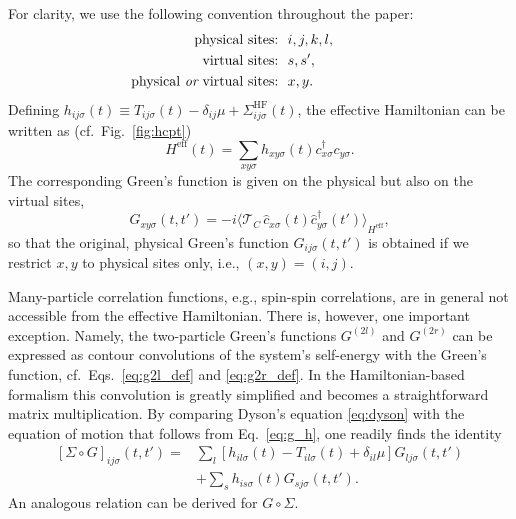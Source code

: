 \documentclass[twocolumn,prb,showpacs,aps,superscriptaddress]{revtex4}
\newcommand{\cds}[1]{\ensuremath{c^\dagger_{#1}}}
\newcommand{\ccs}[1]{\ensuremath{c_{#1}}}
\newcommand{\cd}[1]{\ensuremath{\hat{c}^\dagger_{#1}}}
\newcommand{\cc}[1]{\ensuremath{\hat{c}_{#1}}}
\newcommand{\est}[1]{\ensuremath{\langle {#1} \rangle}}
\newcommand{\tcorder}[0]{\ensuremath{\mathcal{T}_C}}
\begin{document}
For clarity, we use the following convention throughout the paper:
\begin{align} 
  \text{physical sites:}&~~i,j,k,l,\qquad\qquad\\
  \text{virtual sites:}&~~s,s',\nonumber\\ 
  \text{physical {\em or} virtual sites:}&~~x,y.\nonumber
\end{align} 
Defining $h_{ij\sigma}(t) \equiv T_{ij\sigma}(t) - \delta_{ij}\mu +
\Sigma^\mathrm{HF}_{ij\sigma}(t)$, the effective Hamiltonian can be written as
(cf.\ Fig.\ \ref{fig:hcpt})
\begin{equation}
  \label{eq:h_TU}
  H^\mathrm{eff}(t) 
  = 
  \sum_{xy\sigma} h_{xy\sigma}(t) \cds{x\sigma}\ccs{y\sigma}.
\end{equation}
The corresponding Green's function is given on the physical but also on the
virtual sites, 
\begin{equation}
  \label{eq:g_h}
  G_{xy\sigma}(t,t')
  =
  -i
  \est
  {
    \tcorder\,\cc{x\sigma}(t)\cd{y\sigma}(t')
  }_{ H^\mathrm{eff} },
\end{equation}
so that the original, physical Green's function $G_{ij\sigma}(t,t')$ is
obtained if we restrict $x,y$ to physical sites only, i.e., $(x,y) = (i,j)$.

Many-particle correlation functions, e.g., spin-spin correlations, are in
general not accessible from the effective Hamiltonian.  There is, however, one
important exception. Namely, the two-particle Green's functions $G^{(2l)}$ and
$G^{(2r)}$ can be expressed as contour convolutions of the system's self-energy
with the Green's function, cf.\ Eqs.\ \eqref{eq:g2l_def} and
\eqref{eq:g2r_def}. In the Hamiltonian-based formalism this convolution is
greatly simplified and becomes a straightforward matrix multiplication. By
comparing Dyson's equation \eqref{eq:dyson} with the equation of motion that
follows from Eq.\ \eqref{eq:g_h}, one readily finds the identity
\begin{align}
  \label{eq:tomarkovian}
  [\Sigma \circ G]_{ij\sigma}(t,t')
  =
  &\sum_{l}
  \left[
    h_{il\sigma}(t)-T_{il\sigma}(t) + \delta_{il}\mu
  \right]
  G_{lj\sigma}(t,t') \nonumber\\
  &+
  \sum_s h_{is\sigma}(t) G_{sj\sigma}(t,t').
\end{align}
An analogous relation can be derived for $G\circ \Sigma$. 
\end{document}
